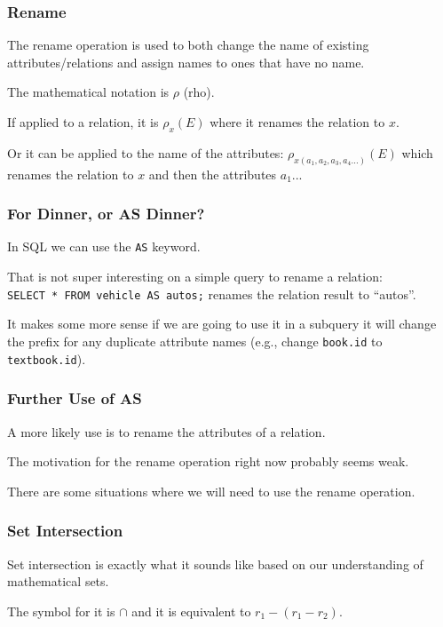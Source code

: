 \begin{frame}
\frametitle{Rename}

The \alert{rename} operation is used to both change the name of existing attributes/relations and assign names to ones that have no name. 

The mathematical notation is $\rho$ (rho).

 If applied to a relation, it is $\rho_{x}(E)$ where it renames the relation to $x$. 
 
Or it can be applied to the name of the attributes: $\rho_{x(a_{1}, a_{2}, a_{3}, a_{4}...)}(E)$ which renames the relation to $x$ and then the attributes $a_{1}$...

\end{frame}



\begin{frame}
\frametitle{For Dinner, or AS Dinner?}

In SQL we can use the \texttt{AS} keyword. 

That is not super interesting on a simple query to rename a relation:\\
 \texttt{SELECT * FROM vehicle AS autos;} renames the relation result to ``autos''.
 
 It makes some more sense if we are going to use it in a subquery it will change the prefix for any duplicate attribute names (e.g., change \texttt{book.id} to \texttt{textbook.id}). 



\end{frame}


\begin{frame}
\frametitle{Further Use of AS}

A more likely use is to rename the attributes of a relation.

The motivation for the rename operation right now probably seems weak. 

There are some situations where we will need to use the rename operation.

\end{frame}




\begin{frame}
\frametitle{Set Intersection}

\alert{Set intersection} is exactly what it sounds like based on our understanding of mathematical sets. 

The symbol for it is $\cap$ and it is equivalent to $r_{1} - (r_{1} - r_{2})$.

\end{frame}



